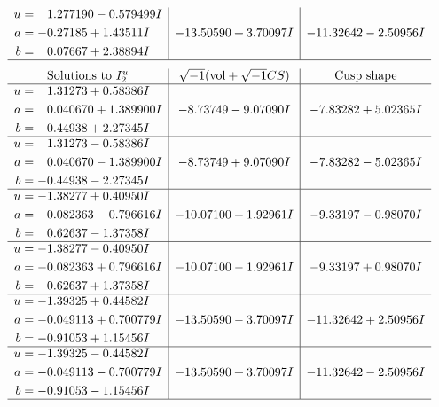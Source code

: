 \documentclass[1p]{elsarticle_modified}
\theoremstyle{definition}
\newcommand{\I}{\sqrt{-1}}
\begin{document}
$$\begin{array}{c|c|c}
\begin{aligned}
u &= \phantom{-}1.277190 - 0.579499 I \\
a &= -0.27185 + 1.43511 I \\
b &= \phantom{-}0.07667 + 2.38894 I\end{aligned}
 & -13.50590 + 3.70097 I & -11.32642 - 2.50956 I\\
 \hline 
 \end{array}$$\newpage$$\begin{array}{c|c|c}  
\text{Solutions to }I^u_{2}& \I (\text{vol} + \sqrt{-1}CS) & \text{Cusp shape}\\
 \hline 
\begin{aligned}
u &= \phantom{-}1.31273 + 0.58386 I \\
a &= \phantom{-}0.040670 + 1.389900 I \\
b &= -0.44938 + 2.27345 I\end{aligned}
 & -8.73749 - 9.07090 I & -7.83282 + 5.02365 I \\ \hline\begin{aligned}
u &= \phantom{-}1.31273 - 0.58386 I \\
a &= \phantom{-}0.040670 - 1.389900 I \\
b &= -0.44938 - 2.27345 I\end{aligned}
 & -8.73749 + 9.07090 I & -7.83282 - 5.02365 I \\ \hline\begin{aligned}
u &= -1.38277 + 0.40950 I \\
a &= -0.082363 - 0.796616 I \\
b &= \phantom{-}0.62637 - 1.37358 I\end{aligned}
 & -10.07100 + 1.92961 I & -9.33197 - 0.98070 I \\ \hline\begin{aligned}
u &= -1.38277 - 0.40950 I \\
a &= -0.082363 + 0.796616 I \\
b &= \phantom{-}0.62637 + 1.37358 I\end{aligned}
 & -10.07100 - 1.92961 I & -9.33197 + 0.98070 I \\ \hline\begin{aligned}
u &= -1.39325 + 0.44582 I \\
a &= -0.049113 + 0.700779 I \\
b &= -0.91053 + 1.15456 I\end{aligned}
 & -13.50590 - 3.70097 I & -11.32642 + 2.50956 I \\ \hline\begin{aligned}
u &= -1.39325 - 0.44582 I \\
a &= -0.049113 - 0.700779 I \\
b &= -0.91053 - 1.15456 I\end{aligned}
 & -13.50590 + 3.70097 I & -11.32642 - 2.50956 I\\
 \hline 
 \end{array}$$\newpage\newpage\renewcommand{\arraystretch}{1}
\end{document}
